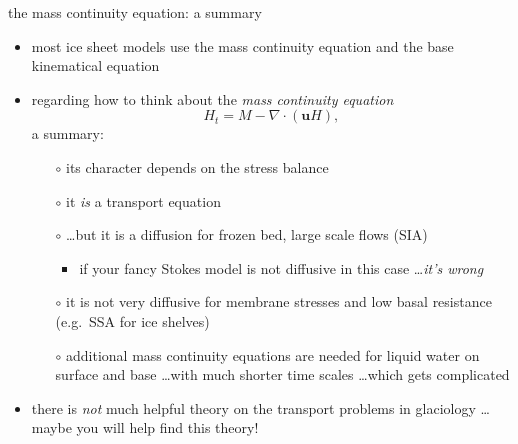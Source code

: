 \begin{frame}{the mass continuity equation: a summary}

\begin{itemize}
\item most ice sheet models use the mass continuity equation and the base kinematical equation

\bigskip
\item regarding how to think about the \emph{mass continuity equation}
  $$H_t = M - \nabla \cdot (\mathbf{u} H),$$
a summary:
  \begin{itemize}
  \item[$\circ$] its character depends on the stress balance
  \item[$\circ$] it \emph{is} a transport equation
  \item[$\circ$] \dots but it is a diffusion for frozen bed, large scale flows (SIA)
      \begin{itemize}
      \item if your fancy Stokes model is not diffusive in this case \dots \emph{it's wrong}
      \end{itemize}
  \item[$\circ$] it is not very diffusive for membrane stresses and low basal resistance (e.g.~SSA for ice shelves)
  \item[$\circ$] additional mass continuity equations are needed for liquid water on surface and base \dots with much shorter time scales \dots which gets complicated
  \end{itemize}

\medskip
\item there is \emph{not} much helpful theory on the transport problems in glaciology \dots maybe you will help find this theory!
\end{itemize}
\end{frame}


